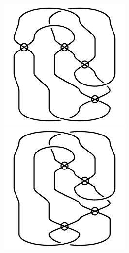 \begin{figure}[H]
\begin{minipage}[b]{.18\linewidth}
\centering
\includegraphics[width=\linewidth]{../data/virtual_4_57.png}
\end{minipage}
\begin{minipage}[b]{.18\linewidth}
\centering
\includegraphics[width=\linewidth]{../data/virtual_4_58.png}

\end{minipage}
\end{figure}
